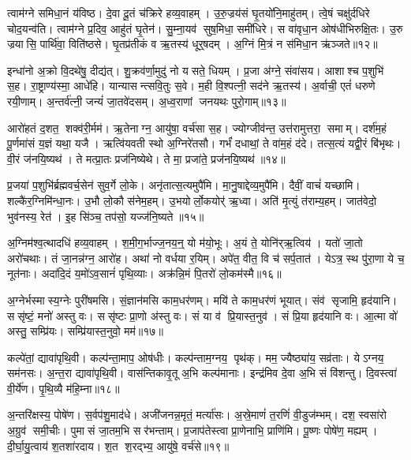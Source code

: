 त्वाम॑ग्ने समिधा॒नं य॑विष्ठ।
दे॒वा दू॒तं च॑क्रिरे हव्य॒वाहम्।
उ॒रु॒ज्रय॑सं घृ॒तयो॑नि॒माहु॑तम्।
त्वे॒षं चक्षु॑र्दधिरे चोद॒यन्व॑ति।
त्वाम॑ग्ने प्र॒दिव॒ आहु॑तं घृ॒तेन॑।
सु॒म्ना॒यव॑ सुष॒मिधा॒ समी॑धिरे।
स वा॑वृधा॒न ओष॑धीभिरुक्षि॒तः।
उ॒रु ज्रयासि॒ पार्थि॑वा॒ विति॑ष्ठसे।
घृ॒तप्र॑तीकं व ऋ॒तस्य॑ धूर्॒षदम्।
अ॒ग्निं मि॒त्रं न स॑मिधा॒न ऋ॑ञ्जते॥१२॥

इन्धा॑नो अ॒क्रो वि॒दथे॑षु॒ दीद्य॑त्।
शु॒क्रव॑र्णा॒मुदु॑ नो यसते॒ धियम्।
प्र॒जा अ॑ग्ने॒ संवा॑सय।
आशाश्च प॒शुभि॑ स॒ह।
रा॒ष्ट्राण्य॑स्मा॒ आधे॑हि।
यान्यासन्त्सवि॒तुः स॒वे।
म॒ही वि॒श्पत्नी॒ सद॑ने ऋ॒तस्य॑।
अ॒र्वाची॒ एतं॑ धरुणे रयी॒णाम्।
अ॒न्तर्व॑त्नी॒ जन्यं॑ जा॒तवे॑दसम्।
अ॒ध्व॒राणां जनयथः पुरो॒गाम्॥१३॥

आरो॑हतं द॒शत॒ शक्व॑री॒र्मम॑।
ऋ॒तेनाग्न॒ आयु॑षा॒ वर्च॑सा स॒ह।
ज्योग्जीव॑न्त॒ उत्त॑रामुत्तरा॒ समाम्।
दर्\mbox{}श॑म॒हं पू॒र्णमा॑सं य॒ज्ञं यथा॒ यजै।
ऋत्वि॑यवती स्थो अ॒ग्निरे॑तसौ।
गर्भं॑ दधाथां॒ ते वा॑म॒हं द॑दे।
तत्स॒त्यं यद्वी॒रं बि॑भृथः।
वी॒रं ज॑नयि॒ष्यथ॑।
ते मत्प्रा॒तः प्रज॑निष्येथे।
ते मा॒ प्रजा॑ते॒ प्रज॑नयि॒ष्यथ॑॥१४॥

प्र॒जया॑ प॒शुभि॑र्ब्रह्मवर्च॒सेन॑ सुव॒र्गे लो॒के।
अनृ॑तात्स॒त्यमुपै॑मि।
मा॒नु॒षाद्देव्य॒मुपै॑मि।
दैवीं॒ वाचं॑ यच्छामि।
शल्कै॑र॒ग्निमि॑न्धा॒नः।
उ॒भौ लो॒कौ स॑नेम॒हम्।
उ॒भयोर्लो॒कयोर्॑ ऋ॒ध्वा।
अति॑ मृ॒त्युं त॑राम्य॒हम्।
जात॑वेदो॒ भुव॑नस्य॒ रेत॑।
इ॒ह सि॑ञ्च॒ तप॑सो॒ यज्ज॑नि॒ष्यते॥१५॥

अ॒ग्निम॑श्व॒त्थादधि॑ हव्य॒वाहम्।
श॒मी॒ग॒र्भाज्ज॒नय॒न्॒ यो म॑यो॒भूः।
अ॒यं ते॒ योनि॑र्‌ऋ॒त्विय॑।
यतो॑ जा॒तो अरो॑चथाः।
तं जा॒नन्न॑ग्न॒ आरो॑ह।
अथा॑ नो वर्धया र॒यिम्।
अपे॑त॒ वीत॒ वि च॑ सर्प॒तात॑।
येऽत्र॒ स्थ पु॑रा॒णा ये च॒ नूत॑नाः।
अदा॑दि॒दं य॒मो॑ऽव॒सानं॑ पृथि॒व्याः।
अक्र॑न्नि॒मं पि॒तरो॑ लो॒कम॑स्मै॥१६॥

अ॒ग्नेर्भस्मास्य॒ग्नेः पुरी॑षमसि।
सं॒ज्ञान॑मसि काम॒धर॑णम्।
मयि॑ ते काम॒धर॑णं भूयात्।
संव॑ सृजामि॒ हृद॑यानि।
ससृ॑ष्टं॒ मनो॑ अस्तु वः।
ससृ॑ष्टः प्रा॒णो अ॑स्तु वः।
सं या व॑ प्रि॒यास्त॒नुव॑।
सं प्रि॒या हृद॑यानि वः।
आ॒त्मा वो॑ अस्तु॒ सम्प्रि॑यः।
सम्प्रि॑यास्त॒नुवो॒ मम॑॥१७॥

कल्पे॑तां॒ द्यावा॑पृथि॒वी।
कल्प॑न्ता॒माप॒ ओष॑धीः।
कल्प॑न्ताम॒ग्नय॒ पृथ॑क्।
मम॒ ज्यैष्ठ्या॑य॒ सव्र॑ताः।
येऽग्नय॒ सम॑नसः।
अ॒न्त॒रा द्यावा॑पृथि॒वी।
वास॑न्तिकावृ॒तू अ॒भि कल्प॑मानाः।
इन्द्र॑मिव दे॒वा अ॒भि सं वि॑शन्तु।
दि॒वस्त्वा॑ वी॒र्ये॑ण।
पृ॒थि॒व्यै म॑हि॒म्ना॥१८॥

अ॒न्तरि॑क्षस्य॒ पोषे॑ण।
स॒र्वप॑शु॒माद॑धे।
अजी॑जनन्न॒मृतं॒ मर्त्या॑सः।
अ॒स्रे॒माणं॑ त॒रणिं॑ वी॒डुज॑म्भम्।
दश॒ स्वसा॑रो अ॒ग्रुव॑ समी॒चीः।
पुमासं जा॒तम॒भि सर॑भन्ताम्।
प्र॒जाप॑तेस्त्वा प्रा॒णेनाभि॒ प्राणि॑मि।
पू॒ष्णः पोषे॑ण॒ मह्यम्।
दी॒र्घा॒यु॒त्वाय॑ श॒तशा॑रदाय।
श॒त श॒रद्भ्य॒ आयु॑षे॒ वर्च॑से॥१९॥

